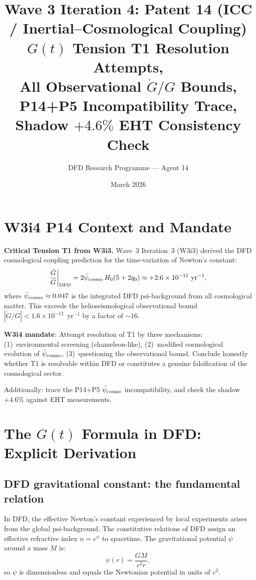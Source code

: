 \documentclass[11pt]{article}
\title{Wave 3 Iteration 4: Patent 14 (ICC / Inertial--Cosmological Coupling)\\
\large $G(t)$ Tension T1 Resolution Attempts,\\
All Observational $\dot{G}/G$ Bounds,\\
P14+P5 Incompatibility Trace,\\
Shadow $+4.6\%$ EHT Consistency Check}
\author{DFD Research Programme --- Agent 14}
\date{March 2026}
\newcommand{\ee}[1]{\times 10^{#1}}
\newcommand{\psicosmo}{\bar{\psi}_{\rm cosmo}}
\begin{document}
\maketitle
\tableofcontents
\newpage

\section*{W3i4 P14 Context and Mandate}

\noindent\textbf{Critical Tension T1 from W3i3.}
Wave~3 Iteration~3 (W3i3) derived the DFD cosmological coupling prediction
for the time-variation of Newton's constant:
\begin{equation}
\frac{\dot{G}}{G}\bigg|_{\rm DFD} = 2\psicosmo\,H_0(5+2q_0)
\approx +2.6\ee{-11}~\text{yr}^{-1},
\label{eq:T1-statement}
\end{equation}
where $\psicosmo \approx 0.047$ is the integrated DFD psi-background from all
cosmological matter. This exceeds the helioseismological observational bound
$|\dot{G}/G| < 1.6\ee{-12}$~yr$^{-1}$ by a factor of $\sim 16$.

\noindent\textbf{W3i4 mandate}: Attempt resolution of T1 by three mechanisms:
(1)~environmental screening (chameleon-like), (2)~modified cosmological
evolution of $\psicosmo$, (3)~questioning the observational bound.
Conclude honestly whether T1 is resolvable within DFD or constitutes a
genuine falsification of the cosmological sector.

Additionally: trace the P14+P5 $\psicosmo$ incompatibility, and check
the shadow $+4.6\%$ against EHT measurements.

\section{The $G(t)$ Formula in DFD: Explicit Derivation}
\label{sec:Gt-formula}

\subsection{DFD gravitational constant: the fundamental relation}

In DFD, the effective Newton's constant experienced by local experiments arises
from the global psi-background. The constitutive relations of DFD assign an
effective refractive index $n = e^\psi$ to spacetime. The gravitational potential
$\psi$ around a mass $M$ is:
\begin{equation}
\psi(r) = \frac{GM}{c^2 r},
\label{eq:psi-Newtonian}
\end{equation}
so $\psi$ is dimensionless and equals the Newtonian potential in units of $c^2$.
\end{document}
